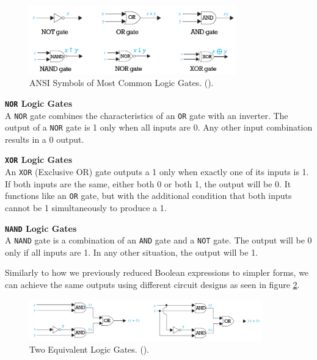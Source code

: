 \begin{figure}[h!]
    \centering
    \includegraphics[width = 0.8\textwidth]{figure/gates.png} %
    \caption{ANSI Symbols of Most Common Logic Gates. (\cite{rosen2012}).}
    \label{fig:gates}
\end{figure}

\textbf{\texttt{NOR} Logic Gates}\\
A \texttt{NOR} gate combines the characteristics of an \texttt{OR} gate with an inverter. The output of a \texttt{NOR} gate is 1 only when all inputs are 0. Any other input combination results in a 0 output.

\textbf{\texttt{XOR} Logic Gates}\\
An \texttt{XOR} (Exclusive OR) gate outputs a 1 only when exactly one of its inputs is 1. If both inputs are the same, either both 0 or both 1, the output will be 0. It functions like an \texttt{OR} gate, but with the additional condition that both inputs cannot be 1 simultaneously to produce a 1.

\textbf{\texttt{NAND} Logic Gates}\\
A \texttt{NAND} gate is a combination of an \texttt{AND} gate and a \texttt{NOT} gate. The output will be 0 only if all inputs are 1. In any other situation, the output will be 1.

Similarly to how we previously reduced Boolean expressions to simpler forms, we can achieve the same outputs using different circuit designs as seen in figure \ref{fig:gates2}.

\begin{figure}[h!]
    \centering
    \includegraphics[width = 0.9\textwidth]{figure/gatessimilar.png} %
    \caption{Two Equivalent Logic Gates. (\cite{rosen2012}).}
    \label{fig:gates2}
\end{figure}

